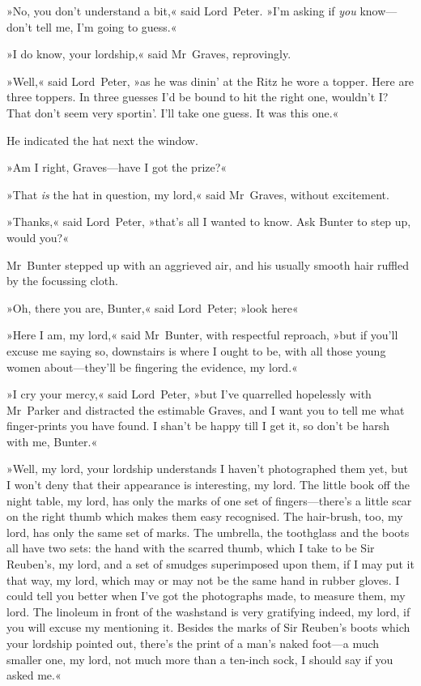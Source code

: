 »No, you don't understand a bit,« said Lord~Peter. »I'm asking if \textit{you} know—don't tell me, I'm going to guess.«

»I do know, your lordship,« said Mr~Graves, reprovingly.

»Well,« said Lord~Peter, »as he was dinin' at the Ritz he wore a topper. Here are three toppers. In three guesses I'd be bound to hit the right one, wouldn't I? That don't seem very sportin'. I'll take one guess. It was this one.«

He indicated the hat next the window.

»Am I right, Graves—have I got the prize?«

»That \textit{is} the hat in question, my lord,« said Mr~Graves, without excitement.

»Thanks,« said Lord~Peter, »that's all I wanted to know. Ask Bunter to step up, would you?«

Mr~Bunter stepped up with an aggrieved air, and his usually smooth hair ruffled by the focussing cloth.

»Oh, there you are, Bunter,« said Lord~Peter; »look here\longdash«

»Here I am, my lord,« said Mr~Bunter, with respectful reproach, »but if you'll excuse me saying so, downstairs is where I ought to be, with all those young women about—they'll be fingering the evidence, my lord.«

»I cry your mercy,« said Lord~Peter, »but I've quarrelled hopelessly with Mr~Parker and distracted the estimable Graves, and I want you to tell me what finger-prints you have found. I shan't be happy till I get it, so don't be harsh with me, Bunter.«

»Well, my lord, your lordship understands I haven't photographed them yet, but I won't deny that their appearance is interesting, my lord. The little book off the night table, my lord, has only the marks of one set of fingers—there's a little scar on the right thumb which makes them easy recognised. The hair-brush, too, my lord, has only the same set of marks. The umbrella, the toothglass and the boots all have two sets: the hand with the scarred thumb, which I take to be Sir Reuben's, my lord, and a set of smudges superimposed upon them, if I may put it that way, my lord, which may or may not be the same hand in rubber gloves. I could tell you better when I've got the photographs made, to measure them, my lord. The linoleum in front of the washstand is very gratifying indeed, my lord, if you will excuse my mentioning it. Besides the marks of Sir Reuben's boots which your lordship pointed out, there's the print of a man's naked foot—a much smaller one, my lord, not much more than a ten-inch sock, I should say if you asked me.«

